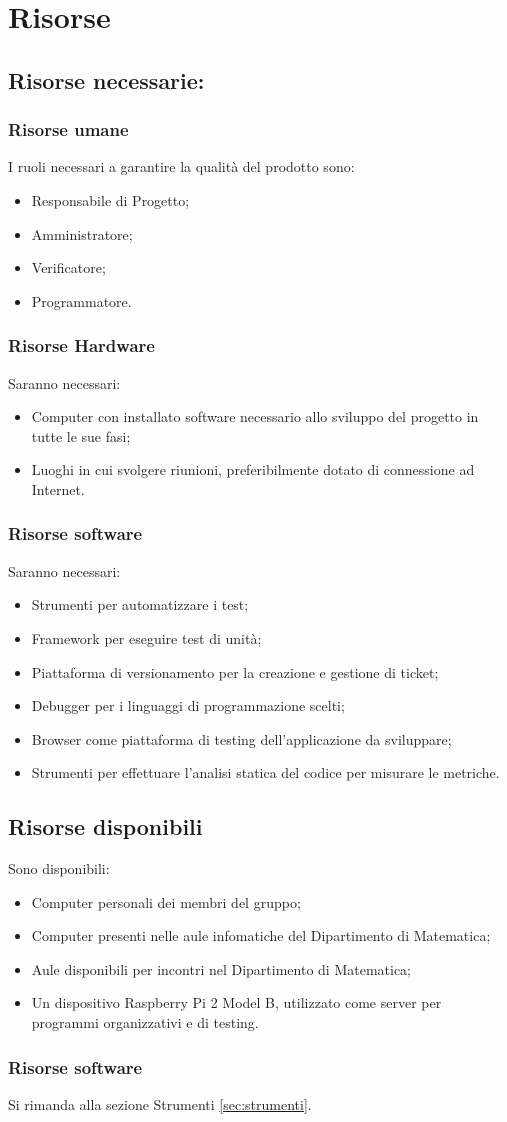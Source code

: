 \section{Risorse}{
\subsection{Risorse necessarie:}{
	\subsubsection{Risorse umane}{
		I ruoli necessari a garantire la qualità del prodotto sono:
		\begin{itemize}
			\item Responsabile di Progetto;
			\item Amministratore;
			\item Verificatore;
			\item Programmatore. 
		\end{itemize}
	}
	\subsubsection{Risorse Hardware}{
		Saranno necessari:
		\begin{itemize}
			\item Computer con installato software necessario allo sviluppo del progetto in tutte le sue fasi;
			\item Luoghi in cui svolgere riunioni, preferibilmente dotato di connessione ad Internet.
		\end{itemize}
	}
	\subsubsection{Risorse software}{
		Saranno necessari:
		\begin{itemize}
			\item Strumenti per automatizzare i test;
			\item Framework per eseguire test di unità;
			\item Piattaforma di versionamento per la creazione e gestione di ticket;
			\item Debugger per i linguaggi di programmazione scelti;
			\item Browser come piattaforma di testing dell'applicazione da sviluppare;
			\item Strumenti per effettuare l'analisi statica del codice per misurare le metriche.
		\end{itemize}
	}
}
\subsection{Risorse disponibili}{
	Sono disponibili:
	\begin{itemize}
		\item Computer personali dei membri del gruppo;
		\item Computer presenti nelle aule infomatiche del Dipartimento di Matematica;
		\item Aule disponibili per incontri nel Dipartimento di Matematica;
		\item Un dispositivo Raspberry Pi 2 Model B, utilizzato come server per programmi organizzativi e di testing.
	\end{itemize}
	\subsubsection{Risorse software}{
		Si rimanda alla sezione Strumenti \ref{sec:strumenti}.
	}
}
}